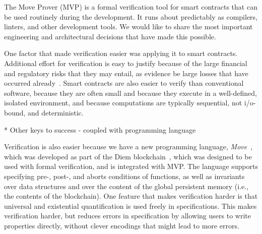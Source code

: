 
The Move Prover (MVP) is a formal verification tool for smart contracts
that can be used routinely during the development.
It runs about predictably as compilers,
linters, and other development tools.
We would like to share the most important engineering and architectural
decisions that have made this possible.

One factor that made verification easier was applying it to smart contracts.
Additional effort for verification is easy to justify because of the
large financial and regulatory risks that they may entail, as evidence
be large losses that have occurred already~\cite{???}.  Smart
contracts are also easier to verify than conventional software,
because they are often small and because they execute in a
well-defined, isolated environment, and because computations are
typically sequential, not i/o-bound, and deterministic.

* Other keys to success
- coupled with programming language




Verification is also easier because we have a new programming language,
\emph{Move}~\cite{MOVE_LANG}, which was developed as part of the
Diem blockchain~\cite{DIEM}, which was designed to be used with formal
verification, and is integrated with MVP.
The language supports specifying
pre-, post-, and aborts conditions of functions, as well as invariants over data
structures and over the content of the global persistent memory
(i.e., the contents of the blockchain).
One feature that makes verification harder is that universal and existential
quantification is used freely in specifications. This makes verification harder,
but reduces errors in specification by allowing users to write properties directly,
without clever encodings that might lead to more errors.

